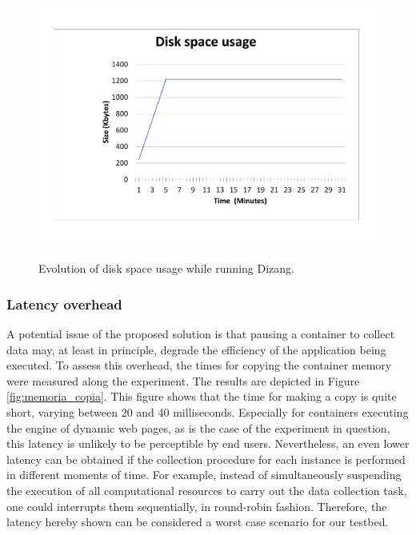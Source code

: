 \documentclass[conference]{IEEEtran}
\newcommand{\marcos}[1]{{\color{green}{MARCOS: #1}}}
\newcommand{\fancyname}{Dizang}
\begin{document}
\begin{figure}[htb!]
\footnotesize
\caption{Evolution of disk space usage while running \fancyname. \marcos{Tranforme em pdf vetorizado. Leia: https://www.investintech.com/resources/blog/archives/8125-how-to-excel-chart-to-pdf.html}}
\includegraphics[center,scale=0.30]{evolucao_coleta_ieee.pdf}
\centering
\label{fig:evolucao_coleta}
\end{figure}


\subsubsection{Latency overhead}
A potential issue of the proposed solution is that pausing a container to collect data may, at least in principle, degrade the efficiency of the application being executed.
%
To assess this overhead, the times for copying the container memory were measured along the experiment.
%
The results are depicted in Figure \ref{fig:memoria_copia}.
%
This figure shows that the time for making a copy is quite short, varying between 20 and 40 milliseconds. 
%
Especially for containers executing the engine of dynamic web pages, as is the case of the experiment in question, this latency is unlikely to be perceptible by end users.
%
Nevertheless, an even lower latency can be obtained if the collection procedure for each instance is performed in different moments of time.
%
For example, instead of simultaneously suspending the execution of all computational resources to carry out the data collection task, one could interrupts them sequentially, in round-robin fashion.
%
Therefore, the latency hereby shown can be considered a worst case scenario for our testbed.
\end{document}
